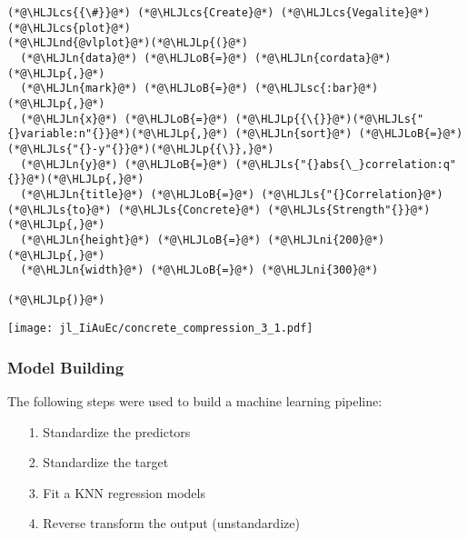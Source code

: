 \documentclass[12pt,a4paper]{article}
\newcommand{\HLJLn}[1]{#1}
\newcommand{\HLJLnd}[1]{\textcolor[RGB]{214,102,97}{#1}}
\newcommand{\HLJLs}[1]{\textcolor[RGB]{201,61,57}{#1}}
\newcommand{\HLJLsc}[1]{\textcolor[RGB]{201,61,57}{#1}}
\newcommand{\HLJLni}[1]{\textcolor[RGB]{59,151,46}{#1}}
\newcommand{\HLJLoB}[1]{\textcolor[RGB]{102,102,102}{\textbf{#1}}}
\newcommand{\HLJLp}[1]{#1}
\newcommand{\HLJLcs}[1]{\textcolor[RGB]{153,153,119}{\textit{#1}}}
\begin{document}
\begin{lstlisting}
(*@\HLJLcs{{\#}}@*) (*@\HLJLcs{Create}@*) (*@\HLJLcs{Vegalite}@*) (*@\HLJLcs{plot}@*)
(*@\HLJLnd{@vlplot}@*)(*@\HLJLp{(}@*)
  (*@\HLJLn{data}@*) (*@\HLJLoB{=}@*) (*@\HLJLn{cordata}@*)(*@\HLJLp{,}@*)
  (*@\HLJLn{mark}@*) (*@\HLJLoB{=}@*) (*@\HLJLsc{:bar}@*)(*@\HLJLp{,}@*)
  (*@\HLJLn{x}@*) (*@\HLJLoB{=}@*) (*@\HLJLp{{\{}}@*)(*@\HLJLs{"{}variable:n"{}}@*)(*@\HLJLp{,}@*) (*@\HLJLn{sort}@*) (*@\HLJLoB{=}@*) (*@\HLJLs{"{}-y"{}}@*)(*@\HLJLp{{\}},}@*)
  (*@\HLJLn{y}@*) (*@\HLJLoB{=}@*) (*@\HLJLs{"{}abs{\_}correlation:q"{}}@*)(*@\HLJLp{,}@*)
  (*@\HLJLn{title}@*) (*@\HLJLoB{=}@*) (*@\HLJLs{"{}Correlation}@*) (*@\HLJLs{to}@*) (*@\HLJLs{Concrete}@*) (*@\HLJLs{Strength"{}}@*)(*@\HLJLp{,}@*)
  (*@\HLJLn{height}@*) (*@\HLJLoB{=}@*) (*@\HLJLni{200}@*)(*@\HLJLp{,}@*)
  (*@\HLJLn{width}@*) (*@\HLJLoB{=}@*) (*@\HLJLni{300}@*)
  
(*@\HLJLp{)}@*)
\end{lstlisting}

\texttt{[image: jl\_IiAuEc/concrete\_compression\_3\_1.pdf]}

\subsubsection{Model Building}
The following steps were used to build a machine learning pipeline:

\begin{itemize}
\item[1. ] Standardize the predictors


\item[2. ] Standardize the target


\item[3. ] Fit a KNN regression models


\item[4. ] Reverse transform the output (unstandardize)

\end{itemize}
\end{document}

